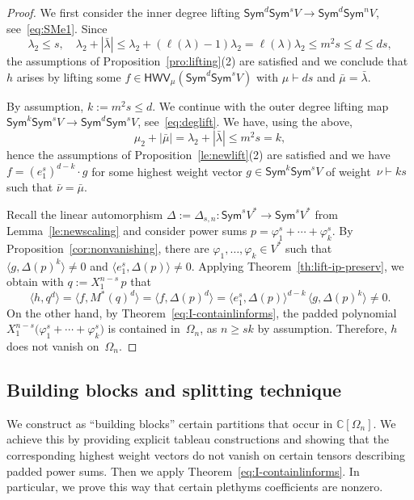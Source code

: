 \documentclass[11pt]{amsart}
\def\Sym{\mathsf{Sym}}
\newcommand{\Det}{\Omega}
\def\la{\lambda}
\newcommand{\IC}{\ensuremath{\mathbb{C}}}
\newcommand{\HWV}{\mathsf{HWV}}
\numberwithin{equation}{section}
\begin{document}
\begin{proof}
We first consider the inner degree lifting 
$\Sym^d\Sym^s V \to \Sym^d\Sym^n V$, 
see~\eqref{eq:SMe1}. Since  
$$ 
\la_2\le s, \quad
\la_2 + |\bar{\la}| \le \la_2 + (\ell(\la)-1) \la_2 =  \ell(\la) \la_2 
 \le m^2 s \le d \le ds,
$$  
the assumptions of Proposition~\ref{pro:lifting}(2) 
are satisfied and we conclude that $h$ arises by 
lifting some $f\in\HWV_{\mu}(\Sym^d\Sym^{s} V)$ 
with $\mu\vdash ds$ and $\bar{\mu} = \bar{\la}$. 

By assumption, $k:= m^2 s \le d$. 
We continue with the outer degree lifting map 
$\Sym^k\Sym^s V \to \Sym^d\Sym^s V$, see~\eqref{eq:deglift}.
We have, using the above,  
$$
 \mu_2 + |\bar{\mu}| = \la_2 + |\bar{\la}| \le m^2 s  = k , 
$$ 
hence the assumptions of Proposition~\ref{le:newlift}(2) 
are satisfied and we have $f= (e_1^s)^{d-k}\cdot g$ 
for some highest weight vector $g\in\Sym^{k}\Sym^s V$ of 
weight~$\nu\vdash ks$ such that
$\bar{\nu}=\bar{\mu}$. 

Recall the linear automorphism  
$\Delta:=\Delta_{s,n}\colon\Sym^{s} V^* \to \Sym^{s} V^*$ 
from Lemma~\ref{le:newscaling}
and consider power sums 
$p = \varphi_1^{s} + \cdots + \varphi_{k}^{s}$.
By Proposition~\ref{cor:nonvanishing}, there are $\varphi_1,\ldots,\varphi_k \in V^*$ 
such that $\langle g, \Delta(p)^k \rangle \ne 0$ and 
$\langle e_1^s, \Delta(p)\rangle \ne 0$. 
Applying Theorem~\ref{th:lift-ip-preserv}, we obtain with 
$q :=X_1^{n-s}\, p$ %
that 
$$
           \langle h , q^{d} \rangle 
        = \langle f , M^*(q)^{d} \rangle 
        = \langle f , \Delta(p)^{d} \rangle 
        = \langle e_1^s, \Delta(p)\rangle^{d-k}\, \langle g, \Delta(p)^{k} \rangle\ne 0 .
$$
On the other hand,  by Theorem~\ref{eq:I-containlinforms},  
the padded polynomial 
$X_1^{n-s} \big( \varphi_1^{s} + \cdots + \varphi_{k}^{s} \big)$ 
is contained in~$\Det_n$, 
as $n\ge sk$ by assumption. 
Therefore, $h$ does not vanish on~$\Det_n$.
\end{proof}

\subsection{Building blocks and splitting technique}\label{sec:BBS} 

We construct as ``building blocks'' certain partitions that occur in $\IC[\Det_n]$. 
We achieve this by providing explicit tableau constructions and showing that 
the corresponding highest weight vectors do not vanish on certain tensors 
describing padded power sums. 
Then we apply Theorem~\ref{eq:I-containlinforms}. 
In particular, we prove this way that  
certain plethyms coefficients are nonzero. 
 
\end{document}
